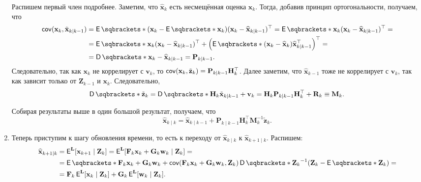 \begin{enumerate}
	Распишем первый член подробнее. Заметим, что \(\hat{\mathbf{x}}_{k}\) есть 
	несмещённая оценка \(\mathbf{x}_{k}\). Тогда, добавив принцип 
	ортогональности, получаем, что
	\begin{align*}
		\cov(\mathbf{x}_{k}, \tilde{\mathbf{x}}_{k \mid k - 1}) &= 
		\E{(\mathbf{x}_{k} - \E{\mathbf{x}_{k}})(\mathbf{x}_{k} - 
		\hat{\mathbf{x}}_{k \mid k - 1})^{\top}} = \E{\mathbf{x}_{k} 
		(\mathbf{x}_{k} - \hat{\mathbf{x}}_{k \mid k - 1})^{\top}} = \\
		&= \E{\mathbf{x}_{k}(\mathbf{x}_{k} - \hat{\mathbf{x}}_{k \mid k - 
		1})^{\top}} + \left(\E{(\mathbf{x}_{k} - \hat{\mathbf{x}}_{k}) 
		\hat{\mathbf{x}}_{k \mid k - 1}^{\top}}\right)^{\top} = \\
		&= \D{\mathbf{x}_{k} - \hat{\mathbf{x}}_{k \mid k - 1}} = \mathbf{P}_{k 
		\mid k - 1}.
	\end{align*}
	Следовательно, так как \(\mathbf{x}_{k}\) не коррелирует с 
	\(\mathbf{v}_{k}\), то \(\operatorname{\mathsf{cov}}(\mathbf{x}_{k}, \tilde{\mathbf{z}}_{k}) = 
	\mathbf{P}_{k \mid k - 1}\mathbf{H}_{k}^{\top}\). Далее заметим, что 
	\(\hat{\mathbf{x}}_{k - 1}\) тоже не коррелирует с \(\mathbf{v}_{k}\), так 
	как зависит только от \(\mathbf{Z}_{k - 1}\) и \(\mathbf{x}_{k}\). 
	Следовательно,
	\begin{align*}
		\D{\tilde{\mathbf{z}}_{k}} = \D{\mathbf{H}_{k} \tilde{\mathbf{x}}_{k 
		\mid k - 1} + \mathbf{v}_{k}} = \mathbf{H}_{k}\mathbf{P}_{k \mid k - 
		1}\mathbf{H}_{k}^{\top} + \mathbf{R}_{k} \equiv \mathbf{M}_{k}.
	\end{align*}
	
	Собирая результаты выше в один большой результат, получаем, что
	\[
		\hat{\mathbf{x}}_{k \mid k} = \hat{\mathbf{x}}_{k \mid k - 1} + 
		\mathbf{P}_{k \mid k - 1}\mathbf{H}_{k}^{\top} 
		\mathbf{M}_{k}^{-1}\tilde{\mathbf{z}}_{k}.
	\]
	
	\item Теперь приступим к шагу обновления времени, то есть к переходу от 
	\(\hat{\mathbf{x}}_{k \mid k}\) к \(\hat{\mathbf{x}}_{k + 1 \mid k}\). 
	Распишем:
	\begin{align*}
		\hat{\mathbf{x}}_{k + 1 \mid k} &= \E^{\mathbf{L}}[\mathbf{x}_{k + 1} 
		\mid \mathbf{Z}_{k}] = \E^{\mathbf{L}}[\mathbf{F}_{k}\mathbf{x}_{k} + 
		\mathbf{G}_{k}\mathbf{w}_{k} \mid \mathbf{Z}_{k}] = \\
		&= \E{\mathbf{F}_{k}\mathbf{x}_{k} + \mathbf{G}_{k}\mathbf{w}_{k}} + 
		\cov(\mathbf{F}_{k}\mathbf{x}_{k} + \mathbf{G}_{k}\mathbf{w}_{k}, 
		\mathbf{Z}_{k})\D{\mathbf{Z}_{k}}^{-1}(\mathbf{Z}_{k} - 
		\E{\mathbf{Z}_{k}}) = \\
		&= \mathbf{F}_{k}\E^{\mathbf{L}}[\mathbf{x}_{k} \mid \mathbf{Z}_{k}] + 
		\mathbf{G}_{k}\E^{\mathbf{L}}[\mathbf{w}_{k} \mid \mathbf{Z}_{k}].
	\end{align*}
	

\end{enumerate}
